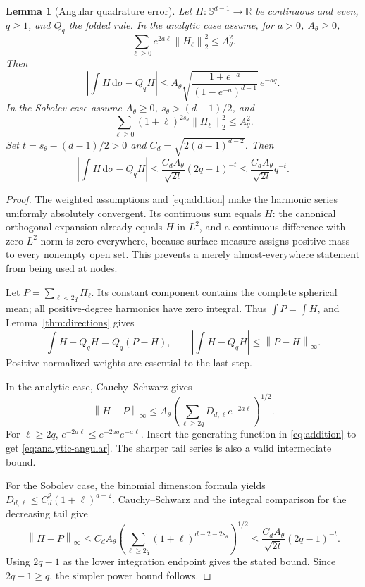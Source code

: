\documentclass[11pt,letterpaper]{article}
\newcommand{\R}{\mathbb R}
\newcommand{\dd}{\,\mathrm d}
\newcommand{\norm}[1]{\left\lVert#1\right\rVert}
\newcommand{\Sph}{\mathbb S^{d-1}}
\newtheorem{lemma}{Lemma}[section]
\theoremstyle{definition}
\theoremstyle{remark}
\begin{document}
\begin{lemma}[Angular quadrature error]\label{thm:angular}
Let \(H:\Sph\to\R\) be continuous and even, \(q\ge1\), and \(Q_q\) the
folded rule. In the analytic case assume, for \(a>0\), \(A_\theta\ge0\),
\[
 \sum_{\ell\ge0}e^{2a\ell}\norm{H_\ell}_2^2\le A_\theta^2.
\]
Then
\begin{equation}\label{eq:analytic-angular}
 \left|\int H\dd\sigma-Q_qH\right|
 \le A_\theta
 \sqrt{\frac{1+e^{-a}}{(1-e^{-a})^{d-1}}}\,e^{-aq}.
\end{equation}
In the Sobolev case assume \(A_\theta\ge0\), \(s_\theta>(d-1)/2\), and
\[
 \sum_{\ell\ge0}(1+\ell)^{2s_\theta}\norm{H_\ell}_2^2\le A_\theta^2.
\]
Set \(t=s_\theta-(d-1)/2>0\) and
\(C_d=\sqrt{2(d-1)^{d-2}}\). Then
\begin{equation}\label{eq:sobolev-angular}
 \left|\int H\dd\sigma-Q_qH\right|
 \le\frac{C_dA_\theta}{\sqrt{2t}}(2q-1)^{-t}
 \le\frac{C_dA_\theta}{\sqrt{2t}}q^{-t}.
\end{equation}
\end{lemma}
\begin{proof}
The weighted assumptions and \eqref{eq:addition} make the harmonic series
uniformly absolutely convergent. Its continuous sum equals \(H\):
the canonical orthogonal expansion already equals \(H\) in \(L^2\), and
a continuous difference with zero \(L^2\) norm is zero everywhere, because
surface measure assigns positive mass to every nonempty open set.
This prevents a merely almost-everywhere statement from being used at nodes.

Let \(P=\sum_{\ell<2q}H_\ell\). Its constant component contains the complete
spherical mean; all positive-degree harmonics have zero integral.
Thus \(\int P=\int H\), and Lemma~\ref{thm:directions} gives
\[
 \int H-Q_qH=Q_q(P-H),\qquad
 |\int H-Q_qH|\le\norm{P-H}_\infty.
\]
Positive normalized weights are essential to the last step.

In the analytic case, Cauchy--Schwarz gives
\[
 \norm{H-P}_\infty
 \le A_\theta\left(\sum_{\ell\ge2q}D_{d,\ell}e^{-2a\ell}\right)^{1/2}.
\]
For \(\ell\ge2q\), \(e^{-2a\ell}\le e^{-2aq}e^{-a\ell}\).
Insert the generating function in \eqref{eq:addition} to get
\eqref{eq:analytic-angular}. The sharper tail series is also a valid
intermediate bound.

For the Sobolev case, the binomial dimension formula yields
\(D_{d,\ell}\le C_d^2(1+\ell)^{d-2}\).
Cauchy--Schwarz and the integral comparison for the decreasing tail give
\[
 \norm{H-P}_\infty
 \le C_dA_\theta
 \left(\sum_{\ell\ge2q}(1+\ell)^{d-2-2s_\theta}\right)^{1/2}
 \le\frac{C_dA_\theta}{\sqrt{2t}}(2q-1)^{-t}.
\]
Using \(2q-1\) as the lower integration endpoint gives the stated bound.
Since \(2q-1\ge q\), the simpler power bound follows.
\end{proof}
\end{document}
